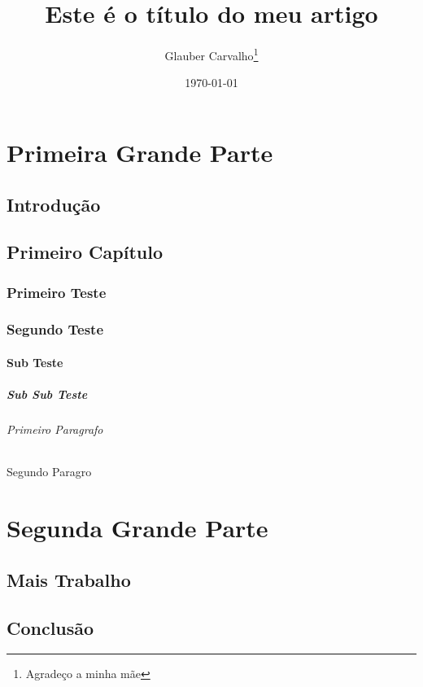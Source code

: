 \documentclass[12pt, a4paperm, openany]{book}	%
\title{Este é o título do meu artigo}	%
\author{Glauber Carvalho\thanks{Agradeço a minha mãe}}	%
\date{\today}	%
\begin{document}
	\renewcommand{\contentsname}{Índice} %
	\tableofcontents
	\part{Primeira Grande Parte}
		\chapter*{Introdução} %
			\lipsum
			
		\chapter{Primeiro Capítulo}
			\lipsum
			\section{Primeiro Teste}
				\lipsum[1]
				
			\section{Segundo Teste}
				\subsection{Sub Teste}
					\subsubsection{Sub Sub Teste}
						\lipsum[1]
						\paragraph{Primeiro Paragrafo}
							\lipsum[1]
						\subparagraph{Segundo Paragro}
							\lipsum[1]
						
			
	\part{Segunda Grande Parte}
		\chapter{Mais Trabalho}
			\lipsum
		\appendix
			\chapter{Conclusão}
				\lipsum
		
\end{document}
